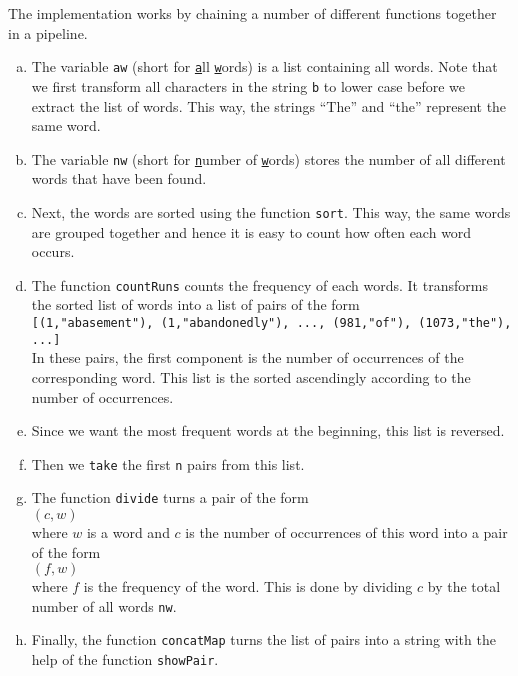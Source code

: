 \begin{enumerate}
      The implementation works by chaining a number of different functions together in a pipeline.
      \begin{enumerate}[(a)]
      \item The variable \texttt{aw} (short for \underline{\texttt{a}}ll \underline{\texttt{w}}ords) is a list
            containing all words.  Note that we first transform all characters in the string \texttt{b} to
            lower case before we extract the list of words.  This way, the strings ``The''  and ``the''
            represent the same word.
      \item The variable \texttt{nw}  (short for \underline{\texttt{n}}umber of \underline{\texttt{w}}ords)
            stores the number of all different words that have been found.
      \item Next, the words are sorted using the function \texttt{sort}.  This way, the same words are grouped
            together and hence it is easy to count how often each word occurs.
      \item The function \texttt{countRuns} counts the frequency of each words.  It transforms the sorted list
            of words into a list of pairs of the form
            \\[0.2cm]
            \hspace*{-0.5cm}
            \texttt{[(1,"abasement"), (1,"abandonedly"), ..., (981,"of"), (1073,"the"), ...]}
            \\[0.2cm]
            In these pairs, the first component is the number of occurrences of the corresponding word.
            This list is the sorted ascendingly according to the number of occurrences.  
      \item Since we want the most frequent words at the beginning, this list is reversed.
      \item Then we \texttt{take} the first \texttt{n} pairs from this list.
      \item The function \texttt{divide} turns a pair of the form
            \\[0.2cm]
            \hspace*{1.3cm}
            $(c, w)$
            \\[0.2cm]
            where $w$ is a word and $c$ is the number of occurrences of this word into a pair of the form
            \\[0.2cm]
            \hspace*{1.3cm}
            $(f, w)$
            \\[0.2cm]
            where $f$ is the frequency of the word.  This is done by dividing $c$ by the total number of all
            words \texttt{nw}.
      \item Finally, the function \texttt{concatMap} turns the list of pairs into a string with the help of the
            function \texttt{showPair}.
      \end{enumerate}      
\end{enumerate}


